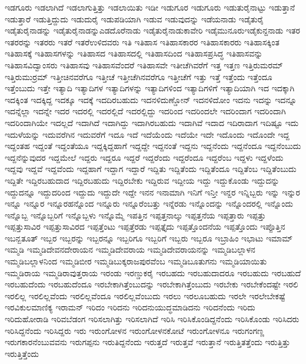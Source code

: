{ಇಡಗೂರು
ಇಡಲಾಗಿದೆ
ಇಡಲಾಗುತ್ತಿತ್ತು
ಇಡಲಾಯಿತು
ಇಡೀ
ಇಡುಗೂರ
ಇಡುಗೂರು
ಇಡುತುರೈನಾಟ್ಟು
ಇಡುತ್ತಾನೆ
ಇಡುತ್ತಾರೆ
ಇಡುತ್ತಿದ್ದುದು
ಇಡುದುರೈ
ಇಡುಪಡಿಯಾಗಿ
ಇಡುವ
ಇಡುವುದನ್ನು
ಇಡೆಯನಾಡು
ಇಡೈತುರೈ
ಇಡೈತುರೈನಾಡನ್ನು
ಇಡೈತುರೈನಾಡನ್ನುಎಡದೊರೆನಾಡು
ಇಡೈತುರೈನಾಡುಕಾವೇರಿ
ಇಡೈಮುನೂರುಇಡೈಕುನ್ದನಾಡು
ಇತರ
ಇತರರನ್ನು
ಇತರರು
ಇತರೆ
ಇತರೆಉಳಿದವರು
ಇತಿ
ಇತಿಹಾಸ
ಇತಿಹಾಸಕಾರರ
ಇತಿಹಾಸಕಾರರು
ಇತಿಹಾಸಕ್ಕಿಂತ
ಇತಿಹಾಸಕ್ಕೆ
ಇತಿಹಾಸಗಳನ್ನು
ಇತಿಹಾಸದ
ಇತಿಹಾಸದಲ್ಲಿ
ಇತಿಹಾಸದಿಂದ
ಇತಿಹಾಸಪ್ರಸಿದ್ಧ
ಇತಿಹಾಸವನ್ನು
ಇತಿಹಾಸವಿದ್ವಾಂಸರು
ಇತಿಹಾಸವು
ಇತಿಹಾಸವೆಂದರೆ
ಇತಿಹಾಸವೇ
ಇತೀಚೆಗಿವರೆಗೆ
ಇತ್ತ
ಇತ್ತಣ
ಇತ್ತಿರುಮರಮ್
ಇತ್ತಿರುಮುರ್ರಮ್
ಇತ್ತೀಚಿನವರೆಗೂ
ಇತ್ತೀಚೆ
ಇತ್ತೀಚೆಗಿನವರೆಗೂ
ಇತ್ತೀಚೆಗೆ
ಇತ್ತು
ಇತ್ತೆ
ಇತ್ತೆಂದು
ಇತ್ತೆಂದೂ
ಇತ್ತೆಂಬುದು
ಇತ್ತೇ
ಇತ್ಯಾದಿ
ಇತ್ಯಾದಿಗಳ
ಇತ್ಯಾದಿಗಳನ್ನು
ಇತ್ಯಾದಿಗಳಿಂದ
ಇತ್ಯಾದಿಗಳಿಗೆ
ಇತ್ಯಾದಿಯಾಗಿ
ಇದ
ಇದಕ್ಕಾಗಿ
ಇದಕ್ಕಿಂತ
ಇದಕ್ಕಿದ್ದ
ಇದಕ್ಕೂ
ಇದಕ್ಕೆ
ಇದದಿರಬಹುದು
ಇದನಳಿದುಣ್ಡೋನ್
ಇದನಳಿದೋಂ
ಇದನು
ಇದನ್ನು
ಇದನ್ನೂ
ಇದನ್ನೆಲ್ಲಾ
ಇದನ್ನೇ
ಇದರ
ಇದರಲ್ಲಿ
ಇದರಲ್ಲಿದೆ
ಇದರಲ್ಲಿದ್ದು
ಇದರಿಂದ
ಇದರಿಂದಲೇ
ಇದರಿಂದಾಗ
ಇದರಿಂದಾಗಿ
ಇದರಿಂದಾಗಿಯೇ
ಇದಲ್ಲದೆ
ಇದಾಗಿದೆ
ಇದಾಗಿದ್ದು
ಇದಾಗಿರಬಹುದು
ಇದಾಗಿವೆ
ಇದಾದ
ಇದಿರಾದಾಗ
ಇದಿಷ್ಟೂ
ಇದು
ಇದುಳೆಯನ್ನು
ಇದುವರೆಗಿನ
ಇದುವರೆಗೆ
ಇದೂ
ಇದೆ
ಇದೆಯೆಂದು
ಇದೆಯೇ
ಇದೇ
ಇದೊಂದು
ಇದೊಂದೇ
ಇದ್ದ
ಇದ್ದಂತಹ
ಇದ್ದಂತೆ
ಇದ್ದಂತೆಯೂ
ಇದ್ದಕ್ಕಿದ್ದಹಾಗೆ
ಇದ್ದದ್ದೇ
ಇದ್ದನಂತೆ
ಇದ್ದನು
ಇದ್ದನೆಂದು
ಇದ್ದನೆಂದೂ
ಇದ್ದನೆಂಬುದು
ಇದ್ದನೆನ್ನುವುದರ
ಇದ್ದಮೇಲೆ
ಇದ್ದರು
ಇದ್ದರೂ
ಇದ್ದರೆ
ಇದ್ದರೆಂದು
ಇದ್ದರೆಂದೂ
ಇದ್ದರೆಂಬ
ಇದ್ದಳು
ಇದ್ದಳೆಂದು
ಇದ್ದವು
ಇದ್ದವೆ
ಇದ್ದವೆಂದು
ಇದ್ದಹಾಗೆ
ಇದ್ದಾಗ
ಇದ್ದಾರೆ
ಇದ್ದಿತು
ಇದ್ದಿತೆಂದು
ಇದ್ದಿತೆಂದೂ
ಇದ್ದಿತೆಂಬ
ಇದ್ದಿತೆಂಬುದು
ಇದ್ದಿತೇ
ಇದ್ದಿರಬಹುದಾದ
ಇದ್ದಿರಬಹುದು
ಇದ್ದಿರಬೇಕು
ಇದ್ದಿರುವ
ಇದ್ದೀಯ
ಇದ್ದು
ಇದ್ದುಕೊಂಡು
ಇದ್ದುದನ್ನು
ಇದ್ದುದನ್ನೂ
ಇದ್ದುದರಿಂದ
ಇದ್ದುದು
ಇದ್ದುದೇ
ಇದ್ದೇ
ಇನನ
ಇನಾಮಾಗಿ
ಇನಿಗೆ
ಇನ್ತೀ
ಇನ್ದರ
ಇನ್ನಿಬ್ಬರು
ಇನ್ನು
ಇನ್ನುರ
ಇನ್ನೂ
ಇನ್ನೂರ
ಇನ್ನೂರಹನ್ನೊಂದ
ಇನ್ನೂರು
ಇನ್ನೂರೆಂಬತ್ತು
ಇನ್ನೆರಡು
ಇನ್ನೊಂದನ್ನು
ಇನ್ನೊಂದರಲ್ಲಿ
ಇನ್ನೊಂದು
ಇನ್ನೊಬ್ಬ
ಇನ್ನೊಬ್ಬರಿಗೆ
ಇನ್ನೊಬ್ಬಳು
ಇನ್ನೊಮ್ಮೆ
ಇಪತ್ತಿನ
ಇಪ್ಪತ್ತನಾಲ್ಕು
ಇಪ್ಪತ್ತನೆಯ
ಇಪ್ಪತ್ತಾರು
ಇಪ್ಪತ್ತು
ಇಪ್ಪತ್ತುಸಾವಿರ
ಇಪ್ಪತ್ತುಸಾವಿರದ
ಇಪ್ಪತ್ತೆಂಟು
ಇಪ್ಪತ್ತೆರಡು
ಇಪ್ಪತ್ತೈದು
ಇಪ್ಪತ್ತೊಂದನೆಯ
ಇಪ್ಪತ್ತೊಂದು
ಇಪ್ಪೊತ್ತಿನ
ಇಬನ್ಬತೂತ್
ಇಬ್ಬರ
ಇಬ್ಬರನ್ನು
ಇಬ್ಬರನ್ನೂ
ಇಬ್ಬರಿಗೂ
ಇಬ್ಬರಿಗೆ
ಇಬ್ಬರು
ಇಬ್ಬರೂ
ಇಬ್ರಾಹಿಂ
ಇಭಾಟು
ಇಮಾಮ್
ಇಮ್ಮಡಿ
ಇಮ್ಮಡಿದೇವನದೇರಾಯನ
ಇಮ್ಮಡಿದೇವರಾಯ
ಇಮ್ಮಡಿದೇವರಾಯನನ್ನು
ಇಮ್ಮಡಿಬಲ್ಲಾಳನ
ಇಮ್ಮಡಿಬಲ್ಲಾಳನಿಂದ
ಇಮ್ಮಡಿಬೀರ
ಇಮ್ಮಡಿಬುಕ್ಕರಾಜಪುರವೆಂಬ
ಇಮ್ಮಡಿಬೂತುಗನು
ಇಮ್ಮಡಿಯಾಯಿತು
ಇಮ್ಮಡಿರಾಯ
ಇಮ್ಮಡಿರಾವುತ್ತರಾಯ
ಇರಂಡು
ಇರಣ್ಡುಕರೈ
ಇರಬಹದು
ಇರಬಹುದಾದರೂ
ಇರಬಹುದು
ಇರಬಹುದೆ
ಇರಬಹುದೆಂದು
ಇರಬಹುದೆಂದೂ
ಇರಬೇಕಾಗಿತ್ತೆಂಬುದನ್ನು
ಇರಬೇಕಾಗಿತ್ತೆಂಬುದು
ಇರಬೇಕು
ಇರಬೇಕೆಂದಷ್ಟೇ
ಇರಲಿ
ಇರಲಿಲ್ಲ
ಇರಲಿಲ್ಲವೆಂದು
ಇರಲಿಲ್ಲವೆಂದೂ
ಇರಲಿಲ್ಲವೆಂಬುದು
ಇರಲು
ಇರಲೂಬಹುದು
ಇರಲೇ
ಇರಲೇಬೇಕಷ್ಟೆ
ಇರವಿಕುಲಮಾಣಿಕ್ಯ
ಇರಾಮನ್
ಇರಿದಂ
ಇರಿದನು
ಇರಿದನುಯುದ್ಧಮಾಡಿದನು
ಇರಿದನೆಂದು
ಇರಿದು
ಇರಿದುಹೋರಾಡಿ
ಇರಿವಬೆಡಂಗ
ಇರಿಸಲಾಗಿತ್ತು
ಇರಿಸಲಾಗಿದೆ
ಇರಿಸಿ
ಇರಿಸಿಕೊಂಡಿದ್ದನೆಂದು
ಇರಿಸಿಕೊಂಡು
ಇರಿಸಿದರು
ಇರಿಸಿದ್ದನೆಂದು
ಇರಿಸಿದ್ದರು
ಇರು
ಇರುಂಗೋಳನ
ಇರುಂಗೋಳನಕೋಟೆ
ಇರುಂಗೋಳನೂ
ಇರುಗಂಗಣ್ಣ
ಇರುಗಕಾರನೆಂಬುವವನು
ಇರುಗಪ್ಪನು
ಇರುತಿದ್ದನೆಂದು
ಇರುತ್ತದೆ
ಇರುತ್ತವೆ
ಇರುತ್ತಾನೆ
ಇರುತ್ತಿತತ್ತೆಂದು
ಇರುತ್ತಿತ್ತು
ಇರುತ್ತಿತ್ತೆಂದು
}

